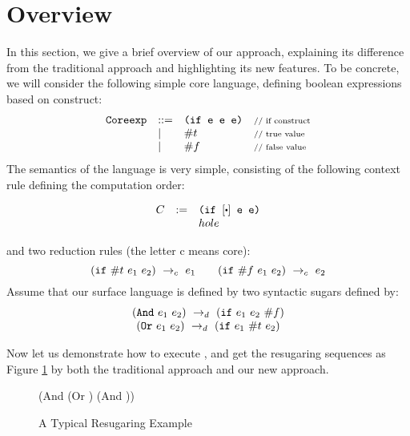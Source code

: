 \section{Overview}
\label{sec2}


In this section, we give a brief overview of our approach, explaining its difference from the traditional approach and highlighting its new features. To be concrete, we will consider the following simple core language, defining boolean expressions based on  construct:
\[
\begin{array}{lllll}
\mbox{\tt Coreexp} &::=& \texttt{(if~e~e~e)} &\mbox{{\scriptsize // if construct}}\\
& |& \#t  & \mbox{{\scriptsize // true value}}\\
& |& \#f & \mbox{{\scriptsize // false value}}
\end{array}
\]
The semantics of the language is very simple, consisting of the following context rule defining the computation order:

\[
\begin{array}{lcl}
C &:=& \Code{(if $[\bigcdot]$ e e)}\\
&&hole\\
\end{array}
\]

and two reduction rules (the letter c means core):
\[
\centering
 \redc{(\m{if}~\true~e_1~e_2)}{e_1}  \qquad \redc{(\m{if}~\false~e_1~e_2)}{e_2} 
\]
Assume that our surface language is defined by two syntactic sugars defined by:
\[
\begin{array}{c}
(\mbox{\tt And}~e_1~e_2) ~\rightarrow_d~ (\mbox{\tt if}~e_1~e_2~\#f)\\
(\mbox{\tt Or}~e_1~e_2) ~\rightarrow_d~ (\mbox{\tt if}~e_1~\#t~e_2)
\end{array}
\]


Now let us demonstrate how to execute , and get the resugaring sequences as Figure \ref{fig:standard} by both the traditional approach and our new approach.

\begin{figure}[t]
\begin{center}
\begin{minipage}{6cm}
\begin{scriptsize}
\begin{Codes}
    (And (Or \true \false) (And \false \true))
\end{Codes}
\end{scriptsize}
\end{minipage}
\end{center}
\caption{A Typical Resugaring Example}
\label{fig:standard}
\end{figure}


